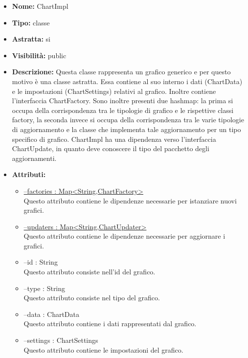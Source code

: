 			
			\begin{itemize}
			\item \textbf{Nome:} ChartImpl
			\item \textbf{Tipo:} classe
			
		\item \textbf{Astratta:}
		si
			\item \textbf{Visibilità:} public
			\item \textbf{Descrizione:} Questa classe rappresenta un grafico generico e per questo motivo è una classe astratta. Essa contiene al suo interno i dati (ChartData) e le impostazioni (ChartSettings) relativi al grafico. Inoltre contiene l'interfaccia ChartFactory. Sono inoltre presenti due hashmap: la prima si occupa della corrispondenza tra le tipologie di grafico e le rispettive classi factory, la seconda invece si occupa della corrispondenza tra le varie tipologie di aggiornamento e la classe che implementa tale aggiornamento per un tipo specifico di grafico. ChartImpl ha una dipendenza verso l'interfaccia ChartUpdate, in quanto deve conoscere il tipo del pacchetto degli aggiornamenti.
			\item \textbf{Attributi:}
				\begin{itemize}
				\setlength{\itemsep}{5pt}
				
					\item[\ding{111}] \underline{--factories : Map<String,ChartFactory>} \\ [1mm] Questo attributo contiene le dipendenze necessarie per istanziare nuovi grafici.
					\item[\ding{111}] \underline{--updaters : Map<String,ChartUpdater>} \\ [1mm] Questo attributo contiene le dipendenze necessarie per aggiornare i grafici.
					\item[\ding{111}] {--id : String} \\ [1mm] Questo attributo consiste nell'id del grafico.
					\item[\ding{111}] {--type : String} \\ [1mm] Questo attributo consiste nel tipo del grafico.
					\item[\ding{111}] {--data : ChartData} \\ [1mm] Questo attributo contiene i dati rappresentati dal grafico.
					\item[\ding{111}] {--settings : ChartSettings} \\ [1mm] Questo attributo contiene le impostazioni del grafico.
				\end{itemize}
		

\end{itemize}
